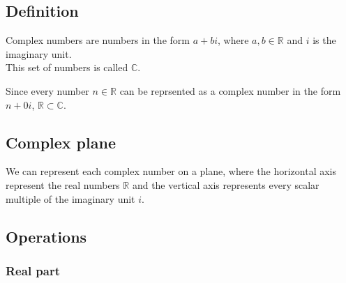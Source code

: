 \documentclass{article}
\begin{document}
\subsection{Definition}

Complex numbers are numbers in the form \(a + bi\),
where \(a,b\in\mathbb{R}\) and \(i\) is the imaginary unit.
\\
This set of numbers is called \(\mathbb{C}\).

Since every number \(n\in\mathbb{R}\) can be reprsented as
a complex number in the form \(n+0i\), \(\mathbb{R}\subset\mathbb{C}\).

\subsection{Complex plane}

We can represent each complex number on a plane, where the horizontal axis
represent the real numbers \(\mathbb{R}\) and the vertical axis represents
every scalar multiple of the imaginary unit \(i\).

\begin{center}
\end{center}

\subsection{Operations}

\subsubsection{Real part}
\end{document}
